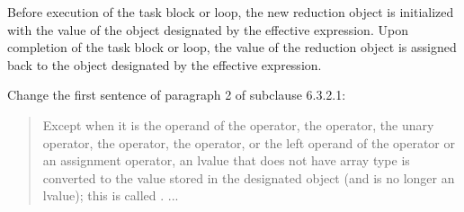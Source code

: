 \pnum
Before execution of the task block or loop,
the new reduction object is initialized
with the value of the object designated by the effective expression.
Upon completion of the task block or loop,
the value of the reduction object is assigned back
to the object designated by the effective expression.

\pnum
Change the first sentence of paragraph 2 of subclause 6.3.2.1:

\begin{quote}
Except when it
is the operand of the  operator,
the  operator, the
unary \tcode{\&} operator,
the \tcode{++} operator,
the \tcode{--} operator,
or the left operand of the  operator
or an assignment operator,
an lvalue that does not have array type
is converted to the value stored in the designated object
(and is no longer an lvalue);
this is called
. ...
\end{quote}
